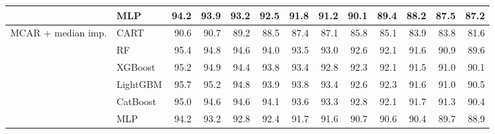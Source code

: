 \begin{table}[p]
\begin{tabular}{@{}llrrrrrrrrrrr@{}}
 & MLP & 94.2 & 93.9 & 93.2 & 92.5 & 91.8 & 91.2 & 90.1 & 89.4 & 88.2 & 87.5 & 87.2 \\
\midrule
MCAR + median imp. & CART & 90.6 & 90.7 & 89.2 & 88.5 & 87.4 & 87.1 & 85.8 & 85.1 & 83.9 & 83.8 & 81.6 \\
 & RF & 95.4 & 94.8 & 94.6 & 94.0 & 93.5 & 93.0 & 92.6 & 92.1 & 91.6 & 90.9 & 89.6 \\
 & XGBoost & 95.2 & 94.9 & 94.4 & 93.8 & 93.4 & 92.8 & 92.3 & 92.1 & 91.5 & 91.0 & 90.1 \\
 & LightGBM & 95.7 & 95.2 & 94.8 & 93.9 & 93.8 & 93.4 & 92.6 & 92.3 & 91.6 & 91.0 & 90.5 \\
 & CatBoost & 95.0 & 94.6 & 94.6 & 94.1 & 93.6 & 93.3 & 92.8 & 92.1 & 91.7 & 91.3 & 90.4 \\
 & MLP & 94.2 & 93.2 & 92.8 & 92.4 & 91.7 & 91.6 & 90.7 & 90.6 & 90.4 & 89.7 & 88.9 \\
\bottomrule
\end{tabular}
\end{table}

